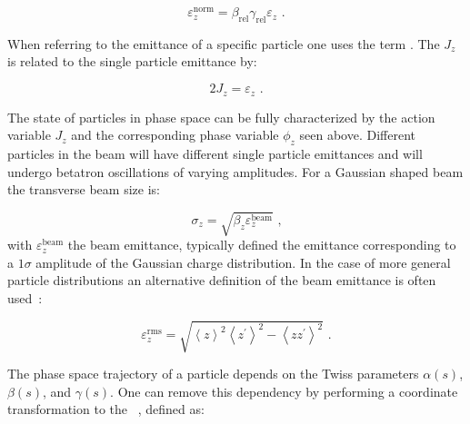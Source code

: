 \begin{equation}
    \varepsilon_z^{\mathrm{norm}} = \beta_{\mathrm{rel}} \gamma_{\mathrm{rel}} \varepsilon_z \text{ .}
    \label{equation:normalized_emittance}
\end{equation}

When referring to the emittance of a specific particle one uses the term .
The  \(J_z\) is related to the single particle emittance by:

\begin{equation}
    2 J_z = \varepsilon_z \text{ .}
    \label{equation:single_particle_action}
\end{equation}

The state of particles in phase space can be fully characterized by the action variable \(J_z\) and the corresponding phase variable \(\phi_z\) seen above. 
Different particles in the beam will have different single particle emittances and will undergo betatron oscillations of varying amplitudes.
For a Gaussian shaped beam the transverse beam size is:

\begin{equation}
    \sigma_z = \sqrt{\beta_z \varepsilon_z^{\mathrm{beam}}} \text{ ,}
    \label{equation:gaussian_beam_transverse_beam_size}
\end{equation}
with \(\varepsilon_z^{\mathrm{beam}}\) the beam emittance, typically defined the emittance corresponding to a \(1 \sigma\) amplitude of the Gaussian charge distribution.
In the case of more general particle distributions an alternative definition of the beam emittance is often used~\cite{CERN:Muller:Beam_Matter_Covariance_Matrix_Emittance, CERN:Buon:CAS_Beam_Phase_Space_Emittance}:

\begin{equation}
    \varepsilon_z^{\mathrm{rms}} = \sqrt{\left\langle z \right\rangle^{2} \left\langle z^{\prime} \right\rangle^{2} - \left\langle zz^{\prime} \right\rangle^{2}} \text{ .}
    \label{equation:beam_emittance_general}
\end{equation}

The phase space trajectory of a particle depends on the Twiss parameters \(\alpha(s)\), \(\beta(s)\), and \(\gamma(s)\).
One can remove this dependency by performing a coordinate transformation to the ~\cite{BOOK:Bazzani:Normal_Form_Approach_Betatron_Motion}, defined as:


